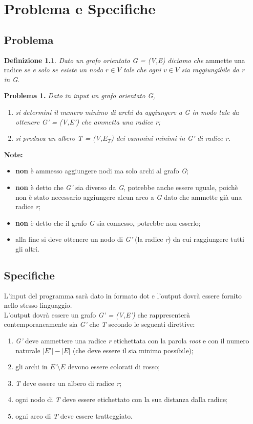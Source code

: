 \documentclass[10pt,a4paper,oneside,article,italian]{memoir}
\newcommand{\capitolo}{\newpage\chapter}
\theoremstyle{definition}
\newtheorem{definition}{Definizione}
\begin{document}
\capitolo{Problema e Specifiche}
\section{Problema}
\begin{definition}\label{def:radice}
\textit{Dato un grafo orientato G = (V,E) diciamo che} ammette una radice \textit{se e solo se esiste un nodo $r \in V$ tale che ogni $v \in V$ sia raggiungibile da r in G.}
\end{definition}
\textbf{Problema 1.} \textit{Dato in input un grafo orientato G,}
\begin{enumerate}[label=(\arabic*)]
\item \label{itm:firstPoint} \textit{si determini il numero minimo di archi da aggiungere a G in modo tale da ottenere G' = (V,E') che ammetta una radice r;}
\item \label{itm:secPoint} \textit{si produca un albero T = (V,$E_T$) dei cammini minimi in G' di radice r.}
\end{enumerate}
\vspace{10pt}
\textbf{Note:}
\begin{itemize}
\item \textbf{non} è ammesso aggiungere nodi ma solo archi al grafo \textit{G};
\item \textbf{non} è detto che \textit{G'} sia diverso da \textit{G}, potrebbe anche essere uguale, poichè non è stato necessario aggiungere alcun arco a \textit{G} dato che ammette già una radice \textit{r};
\item \textbf{non} è detto che il grafo \textit{G} sia connesso, potrebbe non esserlo;
\item alla fine si deve ottenere un nodo di \textit{G'} (la radice \textit{r}) da cui raggiungere tutti gli altri.
\end{itemize}
\section{Specifiche}
L'input del programma sarà dato in formato dot e l'output dovrà essere fornito nello stesso linguaggio.\\
L'output dovrà essere un grafo \textit{G' = (V,E')} che rappresenterà contemporaneamente sia \textit{G'} che \textit{T} secondo le seguenti direttive:
\begin{enumerate}[label=(\arabic*)]
\item \textit{G'} deve ammettere una radice \textit{r} etichettata con la parola \textit{root} e con il numero naturale $|\textit{E'}| - |\textit{E}|$ (che deve essere il sia minimo possibile);
\item gli archi in $\textit{E'} \setminus \textit{E}$ devono essere colorati di rosso;
\item \textit{T} deve essere un albero di radice \textit{r};
\item ogni nodo di \textit{T} deve essere etichettato con la sua distanza dalla radice;
\item ogni arco di \textit{T} deve essere tratteggiato.
\end{enumerate}
\end{document}
